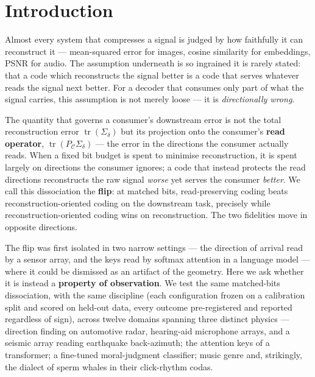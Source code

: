 \documentclass[10pt]{article} %
\theoremstyle{remark}
\newcommand{\PC}{P_{\mathcal{C}}}
\newcommand{\Sd}{\Sigma_{\delta}}
\newcommand{\tr}{\operatorname{tr}}
\begin{document}
\section{Introduction}

Almost every system that compresses a signal is judged by how faithfully it can
reconstruct it --- mean-squared error for images, cosine similarity for embeddings, PSNR
for audio. The assumption underneath is so ingrained it is rarely stated: that a code
which reconstructs the signal better is a code that serves whatever reads the signal next
better. For a decoder that consumes only part of what the signal carries, this
assumption is not merely loose --- it is \emph{directionally wrong}.

The quantity that governs a consumer's downstream error is not the total reconstruction
error $\tr(\Sd)$ but its projection onto the consumer's \textbf{read operator},
$\tr(\PC\Sd)$ --- the error in the directions the consumer actually reads. When a fixed
bit budget is spent to minimise reconstruction, it is spent largely on directions the
consumer ignores; a code that instead protects the read directions reconstructs the raw
signal \emph{worse} yet serves the consumer \emph{better}. We call this dissociation the
\textbf{flip}: at matched bits, read-preserving coding beats reconstruction-oriented
coding on the downstream task, precisely while reconstruction-oriented coding wins on
reconstruction. The two fidelities move in opposite directions.

The flip was first isolated in two narrow settings --- the direction of arrival read by a
sensor array, and the keys read by softmax attention in a language model --- where it
could be dismissed as an artifact of the geometry. Here we ask whether it is instead a
\textbf{property of observation}. We test the same matched-bits dissociation, with the
same discipline (each configuration frozen on a calibration split and scored on held-out
data, every outcome pre-registered and reported regardless of sign), across twelve
domains spanning three distinct physics --- direction finding on automotive radar,
hearing-aid microphone arrays, and a seismic array reading earthquake back-azimuth; the
attention keys of a transformer; a fine-tuned moral-judgment classifier; music genre and,
strikingly, the dialect of sperm whales in their click-rhythm codas.
\end{document}

